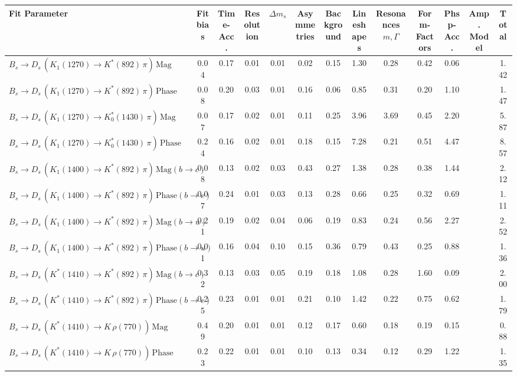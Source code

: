 \begin{tabular}{l  c  c  c  c  c  c  c  c  c  c  c  | c }
\hline
\hline
Fit Parameter & Fit bias & Time-Acc. & Resolution & $\Delta m_{s}$ & Asymmetries & Background & Lineshapes & Resonances $m,\Gamma$ & Form-Factors & Phsp-Acc. & Amp. Model &  Total  \\ 
\hline
$B_s \to D_s \, ( K_1(1270) \to K^{*}(892) \, \pi ) \, \text{Mag}$ & 0.04 & 0.17 & 0.01 & 0.01 & 0.02 & 0.15 & 1.30 & 0.28 & 0.42 & 0.06 &  & 1.42 \\ 
$B_s \to D_s \, ( K_1(1270) \to K^{*}(892) \, \pi ) \, \text{Phase}$ & 0.08 & 0.20 & 0.03 & 0.01 & 0.16 & 0.06 & 0.85 & 0.31 & 0.20 & 1.10 &  & 1.47 \\ 
$B_s \to D_s \, ( K_1(1270) \to K^{*}_{0}(1430) \, \pi ) \, \text{Mag} $ & 0.07 & 0.17 & 0.02 & 0.01 & 0.11 & 0.25 & 3.96 & 3.69 & 0.45 & 2.20 &  & 5.87 \\ 
$B_s \to D_s \, ( K_1(1270) \to K^{*}_{0}(1430) \, \pi ) \, \text{Phase} $ & 0.24 & 0.16 & 0.02 & 0.01 & 0.18 & 0.15 & 7.28 & 0.21 & 0.51 & 4.47 &  & 8.57 \\ 
$B_s \to D_s \, ( K_1(1400) \to K^{*}(892) \, \pi ) \, \text{Mag} (b \to c)$ & 0.08 & 0.13 & 0.02 & 0.03 & 0.43 & 0.27 & 1.38 & 0.28 & 0.38 & 1.44 &  & 2.12 \\ 
$B_s \to D_s \, ( K_1(1400) \to K^{*}(892) \, \pi ) \, \text{Phase} (b \to c)$ & 0.07 & 0.24 & 0.01 & 0.03 & 0.13 & 0.28 & 0.66 & 0.25 & 0.32 & 0.69 &  & 1.11 \\ 
$B_s \to D_s \, ( K_1(1400) \to K^{*}(892) \, \pi ) \, \text{Mag} (b \to u)$ & 0.21 & 0.19 & 0.02 & 0.04 & 0.06 & 0.19 & 0.83 & 0.24 & 0.56 & 2.27 &  & 2.52 \\ 
$B_s \to D_s \, ( K_1(1400) \to K^{*}(892) \, \pi ) \, \text{Phase} (b \to u)$ & 0.01 & 0.16 & 0.04 & 0.10 & 0.15 & 0.36 & 0.79 & 0.43 & 0.25 & 0.88 &  & 1.36 \\ 
$B_s \to D_s \, ( K^{*}(1410) \to K^{*}(892) \, \pi ) \, \text{Mag} (b \to c)$ & 0.32 & 0.13 & 0.03 & 0.05 & 0.19 & 0.18 & 1.08 & 0.28 & 1.60 & 0.09 &  & 2.00 \\ 
$B_s \to D_s \, ( K^{*}(1410) \to K^{*}(892) \, \pi ) \, \text{Phase} (b \to c)$ & 0.25 & 0.23 & 0.01 & 0.01 & 0.21 & 0.10 & 1.42 & 0.22 & 0.75 & 0.62 &  & 1.79 \\ 
$B_s \to D_s \, ( K^{*}(1410) \to K \, \rho(770) ) \, \text{Mag}$ & 0.49 & 0.20 & 0.01 & 0.01 & 0.12 & 0.17 & 0.60 & 0.18 & 0.19 & 0.15 &  & 0.88 \\ 
$B_s \to D_s \, ( K^{*}(1410) \to K \, \rho(770) ) \, \text{Phase}$ & 0.23 & 0.22 & 0.01 & 0.01 & 0.10 & 0.13 & 0.34 & 0.12 & 0.29 & 1.22 &  & 1.35 \\ 

\end{tabular}
